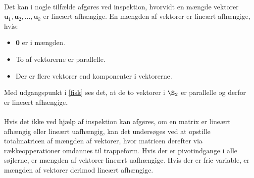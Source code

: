 \\
%
%
Det kan i nogle tilfælde afgøres ved inspektion, hvorvidt en mængde vektorer $\mathbf{u}_1,\mathbf{u}_2,\ldots ,\mathbf{u}_k$ er lineært afhængige. 
En mængden af vektorer er lineært afhængige, hvis:
%
\begin{itemize}
\item $\mathbf{0}$ er i mængden.
\item To af vektorerne er parallelle.
\item Der er flere vektorer end komponenter i vektorerne. 
\end{itemize}
%
Med udgangspunkt i \ref{fisk} ses det, at de to vektorer i $\S_2$ er parallelle og derfor er lineært afhængige. 
\\\\
Hvis det ikke ved hjælp af inspektion kan afgøres, om en matrix er lineært afhængig eller lineært uafhængig, kan det undersøges ved at opstille totalmatricen af mængden af vektorer, hvor matricen derefter via rækkeopperationer omdannes til trappeform. 
Hvis der er pivotindgange i alle søjlerne, er mængden af vektorer lineært uafhængige. Hvis der er frie variable, er mængden af vektorer derimod lineært afhængige.
\\\\
%
